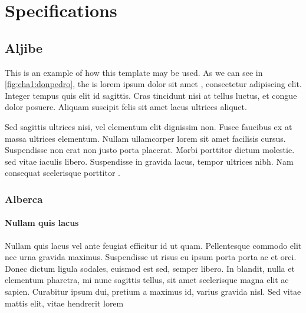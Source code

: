 % 
% 
% 



\clearpage
\cleardoublepage

\chapter{Specifications}

\section{Aljibe}

This is an example of how this template may be used. As we can see in \autoref{fig:cha1:donpedro}, the  is lorem ipsum dolor sit amet  \cite{ESP32_DATASHEET}, consectetur adipiscing elit. Integer tempus quis elit id sagittis. Cras tincidunt nisi at tellus luctus, et congue dolor posuere. Aliquam suscipit felis sit amet lacus ultrices aliquet. 

Sed sagittis ultrices nisi, vel elementum elit dignissim non. Fusce faucibus ex at massa ultrices elementum. Nullam ullamcorper lorem sit amet facilisis cursus. Suspendisse non erat non justo porta placerat. Morbi porttitor dictum molestie.  sed vitae iaculis libero. Suspendisse in gravida lacus, tempor ultrices nibh. Nam consequat scelerisque porttitor \cite{SOLDERDEFECTS}.

\subsection{Alberca}

\subsubsection{Nullam quis lacus}

Nullam quis lacus vel ante feugiat efficitur id ut quam. Pellentesque commodo elit nec urna gravida maximus. Suspendisse ut risus eu ipsum porta porta ac et orci. Donec dictum ligula sodales, euismod est sed, semper libero. In blandit, nulla et elementum pharetra, mi nunc sagittis tellus, sit amet scelerisque magna elit ac sapien. Curabitur ipsum dui, pretium a maximus id, varius gravida nisl. Sed vitae mattis elit, vitae hendrerit lorem

